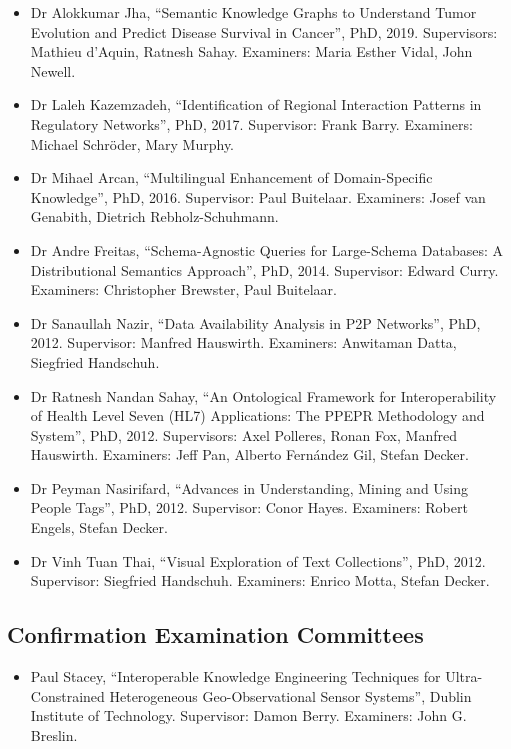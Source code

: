 \documentclass[10pt,a4paper]{res} %
\begin{document}
\begin{resume}
\begin{itemize}
\item Dr Alokkumar Jha, ``Semantic Knowledge Graphs to Understand Tumor Evolution and Predict Disease Survival in Cancer'', PhD, 2019. Supervisors: Mathieu d'Aquin, Ratnesh Sahay. Examiners: Maria Esther Vidal, John Newell.
\item Dr Laleh Kazemzadeh, ``Identification of Regional Interaction Patterns in Regulatory Networks'', PhD, 2017. Supervisor: Frank Barry. Examiners: Michael Schr\"{o}der, Mary Murphy.
\item Dr Mihael Arcan, ``Multilingual Enhancement of Domain-Specific Knowledge'', PhD, 2016. Supervisor: Paul Buitelaar. Examiners: Josef van Genabith, Dietrich Rebholz-Schuhmann.
\item Dr Andre Freitas, ``Schema-Agnostic Queries for Large-Schema Databases: A Distributional Semantics Approach'', PhD, 2014. Supervisor: Edward Curry. Examiners: Christopher Brewster, Paul Buitelaar.
\item Dr Sanaullah Nazir, ``Data Availability Analysis in P2P Networks'', PhD, 2012. Supervisor: Manfred Hauswirth. Examiners: Anwitaman Datta, Siegfried Handschuh.
\item Dr Ratnesh Nandan Sahay, ``An Ontological Framework for Interoperability of Health Level Seven (HL7) Applications: The PPEPR Methodology and System'', PhD, 2012. Supervisors: Axel Polleres, Ronan Fox, Manfred Hauswirth. Examiners: Jeff Pan, Alberto Fern\'{a}ndez Gil, Stefan Decker.
\item Dr Peyman Nasirifard, ``Advances in Understanding, Mining and Using People Tags'', PhD, 2012. Supervisor: Conor Hayes. Examiners: Robert Engels, Stefan Decker.
\item Dr Vinh Tuan Thai, ``Visual Exploration of Text Collections'', PhD, 2012. Supervisor: Siegfried Handschuh. Examiners: Enrico Motta, Stefan Decker.
\end{itemize}

\subsection*{Confirmation Examination Committees}

\begin{itemize} \itemsep -2pt
\item Paul Stacey, ``Interoperable Knowledge Engineering Techniques for Ultra-Constrained Heterogeneous Geo-Observational Sensor Systems'', Dublin Institute of Technology. Supervisor: Damon Berry. Examiners: John G. Breslin.
\end{itemize}


\end{resume}
\end{document}
